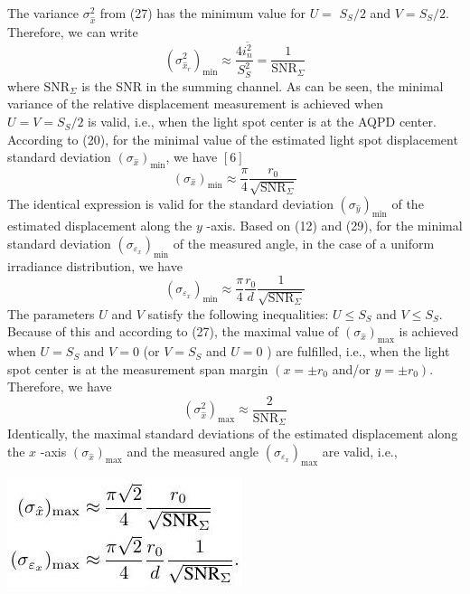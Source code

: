 \documentclass[10pt]{article}
\begin{document}
The variance \(\sigma_{\hat{x}}^{2}\) from (27) has the minimum value for \(U=\) \(S_{S} / 2\) and \(V=S_{S} / 2 .\) Therefore, we can write
\[
\left(\sigma_{\hat{x}_{r}}^{2}\right)_{\min } \approx \frac{4 \overline{i_{n}^{2}}}{S_{S}^{2}}=\frac{1}{\mathrm{SNR}_{\Sigma}}
\]
where \(\mathrm{SNR}_{\Sigma}\) is the SNR in the summing channel. As can be seen, the minimal variance of the relative displacement measurement is achieved when \(U=V=S_{S} / 2\) is valid, i.e., when the light spot center is at the AQPD center. According to (20), for the minimal value of the estimated light spot displacement standard deviation \(\left(\sigma_{\hat{x}}\right)_{\min }\), we have \([6]\)
\[
\left(\sigma_{\hat{x}}\right)_{\min } \approx \frac{\pi}{4} \frac{r_{0}}{\sqrt{\mathrm{SNR}_{\Sigma}}}
\]
The identical expression is valid for the standard deviation \(\left(\sigma_{\hat{y}}\right)_{\min }\) of the estimated displacement along the \(y\) -axis. Based on (12) and (29), for the minimal standard deviation \(\left(\sigma_{\varepsilon_{x}}\right)_{\min }\) of the measured angle, in the case of a uniform irradiance distribution, we have
\[
\left(\sigma_{\varepsilon_{x}}\right)_{\min } \approx \frac{\pi}{4} \frac{r_{0}}{d} \frac{1}{\sqrt{\operatorname{SNR}_{\Sigma}}}
\]
The parameters \(U\) and \(V\) satisfy the following inequalities: \(U \leq S_{S}\) and \(V \leq S_{S}\). Because of this and according to (27), the maximal value of \(\left(\sigma_{\hat{x}}\right)_{\max }\) is achieved when \(U=S_{S}\) and \(V=0\) (or \(V=S_{S}\) and \(U=0\) ) are fulfilled, i.e., when the light spot center is at the measurement span margin \(\left(x=\pm r_{0}\right.\) and/or \(\left.y=\pm r_{0}\right) .\) Therefore, we have
\[
\left(\sigma_{\hat{x}}^{2}\right)_{\max } \approx \frac{2}{\operatorname{SNR}_{\Sigma}}
\]
Identically, the maximal standard deviations of the estimated displacement along the \(x\) -axis \(\left(\sigma_{\hat{x}}\right)_{\max }\) and the measured angle \(\left(\sigma_{\varepsilon_{x}}\right)_{\max }\) are valid, i.e.,

\includegraphics[max width=\textwidth]{5ecfdecb1168916efbeaf9054b715324-05}
\end{document}
